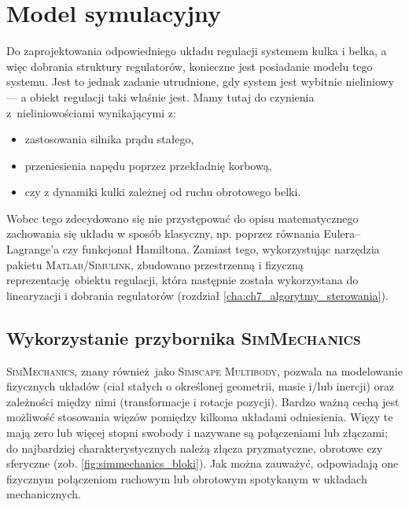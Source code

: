 \chapter{Model symulacyjny}
\label{cha:ch4_model_symulacyjny}

Do zaprojektowania odpowiedniego układu regulacji systemem kulka i belka, a więc dobrania struktury regulatorów, konieczne jest posiadanie modelu tego systemu. Jest to jednak zadanie utrudnione, gdy system jest wybitnie nieliniowy --- a obiekt regulacji taki właśnie jest. Mamy tutaj do czynienia z~nieliniowościami wynikającymi z:
\begin{itemize}
    \item zastosowania silnika prądu stałego,
    \item przeniesienia napędu poprzez przekładnię korbową,
    \item czy z dynamiki kulki zależnej od ruchu obrotowego belki.
\end{itemize}

Wobec tego zdecydowano się nie przystępować do opisu matematycznego zachowania się układu w sposób klasyczny, np. poprzez równania Eulera--Lagrange'a czy funkcjonał Hamiltona. Zamiast tego, wykorzystując narzędzia pakietu \textsc{Matlab/Simulink}, zbudowano przestrzenną i fizyczną reprezentację obiektu regulacji, która następnie została wykorzystana do linearyzacji i dobrania regulatorów (rozdział \ref{cha:ch7_algorytmy_sterowania}).

\section{Wykorzystanie przybornika \textsc{SimMechanics}}
\label{sec:ch4_simmechanics}

\textsc{SimMechanics}, znany również jako \textsc{Simscape Multibody}, pozwala na modelowanie fizycznych układów (ciał stałych o określonej geometrii, masie i/lub inercji) oraz zależności między nimi (transformacje i rotacje pozycji). Bardzo ważną cechą jest możliwość stosowania więzów pomiędzy kilkoma układami odniesienia. Więzy te mają zero lub więcej stopni swobody i nazywane są połączeniami lub złączami; do najbardziej charakterystycznych należą złącza pryzmatyczne, obrotowe czy sferyczne (zob. \cref{fig:simmechanics_bloki}). Jak można zauważyć, odpowiadają one fizycznym połączeniom ruchowym lub obrotowym spotykanym w układach mechanicznych.

